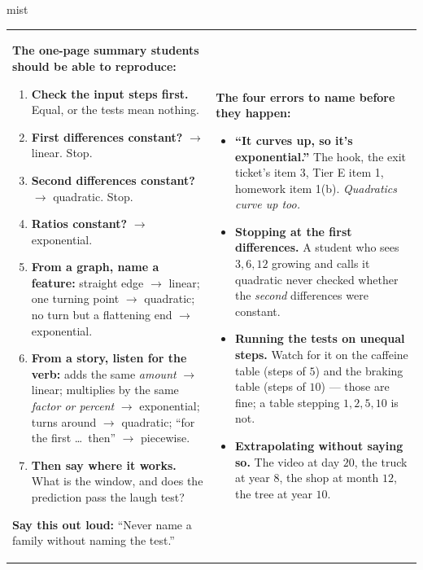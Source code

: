 \documentclass[10pt]{article}
\begin{document}
\boxguard
\begin{skillbox}{mist}
\begin{tabularx}{\linewidth}{@{}X|X@{}}
\begin{minipage}[t]{\linewidth}\vspace{0pt}
\textbf{The one-page summary students should be able to reproduce:}
\begin{enumerate}[leftmargin=1.4em, itemsep=1pt, topsep=2pt]
  \item \textbf{Check the input steps first.} Equal, or the tests mean nothing.
  \item \textbf{First differences constant?} $\to$ linear. Stop.
  \item \textbf{Second differences constant?} $\to$ quadratic. Stop.
  \item \textbf{Ratios constant?} $\to$ exponential.
  \item \textbf{From a graph, name a feature:} straight edge $\to$ linear; one turning point $\to$
        quadratic; no turn but a flattening end $\to$ exponential.
  \item \textbf{From a story, listen for the verb:} adds the same \emph{amount} $\to$ linear;
        multiplies by the same \emph{factor or percent} $\to$ exponential; turns around $\to$
        quadratic; ``for the first \dots\ then'' $\to$ piecewise.
  \item \textbf{Then say where it works.} What is the window, and does the prediction pass the
        laugh test?
\end{enumerate}
\textbf{Say this out loud:} ``Never name a family without naming the test.''
\end{minipage}
&
\begin{minipage}[t]{\linewidth}\vspace{0pt}
\textbf{The four errors to name before they happen:}
\begin{itemize}[leftmargin=1.1em, itemsep=2pt, topsep=2pt]
  \item \textbf{``It curves up, so it's exponential.''} The hook, the exit ticket's item 3, Tier E
        item 1, homework item 1(b). \emph{Quadratics curve up too.}
  \item \textbf{Stopping at the first differences.} A student who sees $3, 6, 12$ growing and calls
        it quadratic never checked whether the \emph{second} differences were constant.
  \item \textbf{Running the tests on unequal steps.} Watch for it on the caffeine table (steps of
        $5$) and the braking table (steps of $10$) --- those are fine; a table stepping $1, 2, 5, 10$
        is not.
  \item \textbf{Extrapolating without saying so.} The video at day $20$, the truck at year $8$, the
        shop at month $12$, the tree at year $10$.
\end{itemize}
\end{minipage}
\end{tabularx}
\end{skillbox}
\end{document}
